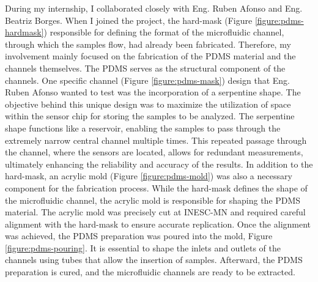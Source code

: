 During my internship, I collaborated closely with Eng. Ruben Afonso and Eng. Beatriz Borges. When I joined the project, the hard-mask (Figure \ref{figure:pdms-hardmask}) responsible for defining the format of the microfluidic channel, through which the samples flow, had already been fabricated. Therefore, my involvement mainly focused on the fabrication of the \ac{PDMS} material and the channels themselves. The \ac{PDMS} serves as the structural component of the channels. One specific channel (Figure \ref{figure:pdms-mask}) design that Eng. Ruben Afonso wanted to test was the incorporation of a serpentine shape. The objective behind this unique design was to maximize the utilization of space within the sensor chip for storing the samples to be analyzed. The serpentine shape functions like a reservoir, enabling the samples to pass through the extremely narrow central channel multiple times. This repeated passage through the channel, where the sensors are located, allows for redundant measurements, ultimately enhancing the reliability and accuracy of the results. In addition to the hard-mask, an acrylic mold (Figure \ref{figure:pdms-mold}) was also a necessary component for the fabrication process. While the hard-mask defines the shape of the microfluidic channel, the acrylic mold is responsible for shaping the \ac{PDMS} material. The acrylic mold was precisely cut at \ac{INESC-MN} and required careful alignment with the hard-mask to ensure accurate replication. Once the alignment was achieved, the \ac{PDMS} preparation was poured into the mold, Figure \ref{figure:pdms-pouring}. It is essential to shape the inlets and outlets of the channels using tubes that allow the insertion of samples. Afterward, the \ac{PDMS} preparation is cured, and the microfluidic channels are ready to be extracted.

